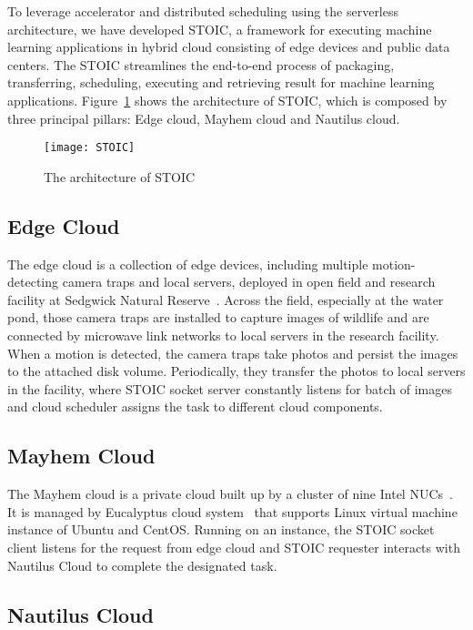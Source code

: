 To leverage accelerator and distributed scheduling using the serverless architecture, we have developed STOIC, a framework for executing machine learning applications in hybrid cloud consisting of edge devices and public data centers. The STOIC streamlines the end-to-end process of packaging, transferring, scheduling, executing and retrieving result for machine learning applications. Figure~\ref{fig:STOIC} shows the architecture of STOIC, which is composed by three principal pillars: Edge cloud, Mayhem cloud and Nautilus cloud.

\begin{figure}[t] \centering 
\texttt{[image: STOIC]}
\caption{The architecture of STOIC
\label{fig:STOIC}}
\end{figure}

\subsection{Edge Cloud}
 The edge cloud is a collection of edge devices, including multiple motion-detecting camera traps and local servers, deployed in open field and research facility at Sedgwick Natural Reserve~\cite{ref:sedgwick}. Across the field, especially at the water pond, those camera traps are installed to capture images of wildlife and are connected by microwave link networks to local servers in the research facility. When a motion is detected, the camera traps take photos and persist the images to the attached disk volume. Periodically, they transfer the photos to local servers in the facility, where STOIC socket server constantly listens for batch of images and cloud scheduler assigns the task to different cloud components. 
 
 \subsection{Mayhem Cloud}
 
 The Mayhem cloud is a private cloud built up by a cluster of nine Intel NUCs~\cite{ref:nucs}. It is managed by Eucalyptus cloud system~\cite{ref:euca} that supports Linux virtual machine instance of Ubuntu and CentOS. Running on an instance, the STOIC socket client listens for the request from edge cloud and STOIC requester interacts with Nautilus Cloud to complete the designated task.
 
 \subsection{Nautilus Cloud}
 
